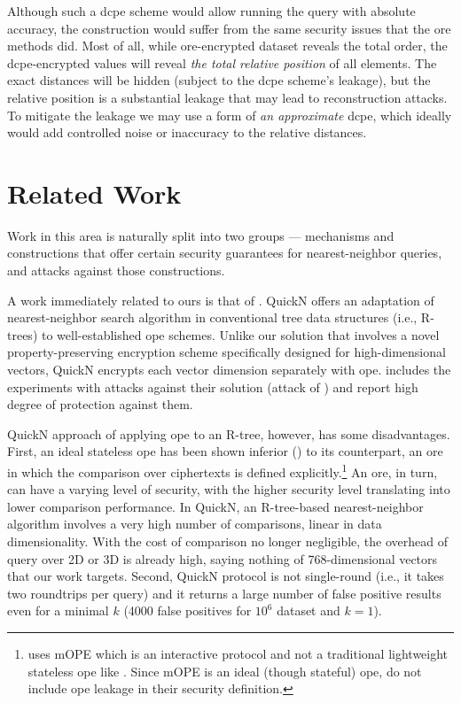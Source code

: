 		Although such a \acrfull{dcpe} scheme would allow running the query with absolute accuracy, the construction would suffer from the same security issues that the \acrshort{ore} methods did.
		Most of all, while \acrshort{ore}-encrypted dataset reveals the total order, the \acrshort{dcpe}-encrypted values will reveal \emph{the total relative position} of all elements.
		The exact distances will be hidden (subject to the \acrshort{dcpe} scheme's leakage), but the relative position is a substantial leakage that may lead to reconstruction attacks.
		To mitigate the leakage we may use a form of \emph{an approximate} \acrshort{dcpe}, which ideally would add controlled noise or inaccuracy to the relative distances.

	\section{Related Work}

		Work in this area is naturally split into two groups --- mechanisms and constructions that offer certain security guarantees for nearest-neighbor queries, and attacks against those constructions.

		A work immediately related to ours is that of \textcite{quick-n}.
		QuickN offers an adaptation of nearest-neighbor search algorithm in conventional tree data structures (i.e., R-trees) to well-established \acrfull{ope} schemes.
		Unlike our solution that involves a novel property-preserving encryption scheme specifically designed for high-dimensional vectors, QuickN encrypts each vector dimension separately with \acrshort{ope}.
		\cite{quick-n} includes the experiments with attacks against their solution (attack of \textcite{leakage-abuse-grubs-2017}) and report high degree of protection against them.

		QuickN approach of applying \acrshort{ope} to an R-tree, however, has some disadvantages.
		First, an ideal stateless \acrshort{ope} has been shown inferior (\cite{ope-leakage}) to its counterpart, an \acrfull{ore} in which the comparison over ciphertexts is defined explicitly.\footnote{
			\cite{quick-n} uses mOPE \cite{ideal-ope} which is an interactive protocol and not a traditional lightweight stateless \acrshort{ope} like \cite{bclo-ope}.
			Since mOPE is an ideal (though stateful) \acrshort{ope}, \cite{quick-n} do not include \acrshort{ope} leakage in their security definition.
		}
		An \acrshort{ore}, in turn, can have a varying level of security, with the higher security level translating into lower comparison performance.
		In QuickN, an R-tree-based nearest-neighbor algorithm involves a very high number of comparisons, linear in data dimensionality.
		With the cost of comparison no longer negligible, the overhead of query over 2D or 3D is already high, saying nothing of 768-dimensional vectors that our work targets.
		Second, QuickN protocol is not single-round (i.e., it takes two roundtrips per query) and it returns a large number of false positive results even for a minimal $k$ (\num{4000} false positives for $10^6$ dataset and $k = 1$).

